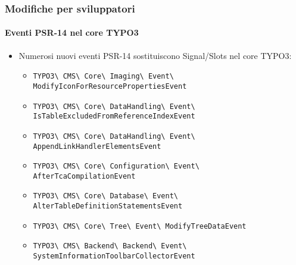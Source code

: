 \begin{frame}[fragile]
	\frametitle{Modifiche per sviluppatori}
	\framesubtitle{Eventi PSR-14 nel core TYPO3}

	\begin{itemize}
		\item Numerosi nuovi eventi PSR-14 sostituiscono Signal/Slots nel core TYPO3:
			\newline

			\begin{itemize}\tiny
				\item \texttt{TYPO3\textbackslash
					CMS\textbackslash
					Core\textbackslash
					Imaging\textbackslash
					Event\textbackslash
					ModifyIconForResourcePropertiesEvent}
					\newline
				\item \texttt{TYPO3\textbackslash
					CMS\textbackslash
					Core\textbackslash
					DataHandling\textbackslash
					Event\textbackslash
					IsTableExcludedFromReferenceIndexEvent}
					\newline
				\item \texttt{TYPO3\textbackslash
					CMS\textbackslash
					Core\textbackslash
					DataHandling\textbackslash
					Event\textbackslash
					AppendLinkHandlerElementsEvent}
					\newline
				\item \texttt{TYPO3\textbackslash
					CMS\textbackslash
					Core\textbackslash
					Configuration\textbackslash
					Event\textbackslash
					AfterTcaCompilationEvent}
					\newline
				\item \texttt{TYPO3\textbackslash
					CMS\textbackslash
					Core\textbackslash
					Database\textbackslash
					Event\textbackslash
					AlterTableDefinitionStatementsEvent}
					\newline
				\item \texttt{TYPO3\textbackslash
					CMS\textbackslash
					Core\textbackslash
					Tree\textbackslash
					Event\textbackslash
					ModifyTreeDataEvent}
					\newline
				\item \texttt{TYPO3\textbackslash
					CMS\textbackslash
					Backend\textbackslash
					Backend\textbackslash
					Event\textbackslash
					SystemInformationToolbarCollectorEvent}
					\newline
			\end{itemize}

	\end{itemize}

\end{frame}

